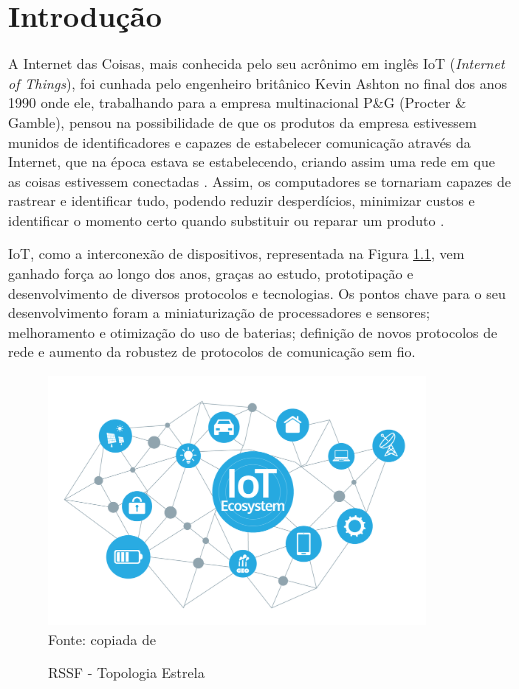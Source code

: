 \chapter[Introdução]{Introdução}
\label{cap:intro}

A Internet das Coisas, mais conhecida pelo seu acrônimo em inglês IoT (\emph{Internet of Things}), foi cunhada pelo engenheiro britânico Kevin Ashton no final dos anos 1990 onde ele, trabalhando para a empresa multinacional P\&G (Procter \& Gamble), pensou na possibilidade de que os produtos da empresa estivessem munidos de identificadores e capazes de estabelecer comunicação através da Internet, que na época estava se estabelecendo, criando assim uma rede em que as coisas estivessem conectadas \cite{KA_IOT}. Assim, os computadores se tornariam capazes de rastrear e identificar tudo, podendo reduzir desperdícios, minimizar custos e identificar o momento certo quando substituir ou reparar um produto \cite{lopezIOT}.

IoT, como a interconexão de dispositivos, representada na Figura \ref{fig:iot}, vem ganhado força ao longo dos anos, graças ao estudo, prototipação e desenvolvimento de diversos protocolos e tecnologias. Os pontos chave para o seu desenvolvimento foram a miniaturização de processadores e sensores; melhoramento e otimização do uso de baterias; definição de novos protocolos de rede e aumento da robustez de protocolos de comunicação sem fio.

\begin{figure}[ht]
      \begin{center}
            \caption{RSSF - Topologia Estrela}
            \includegraphics[width=10cm]{./sections/textual/chapters/images/iot.png}\\
            Fonte: copiada de \cite{figIoT}
            \label{fig:iot}
      \end{center}
\end{figure}


